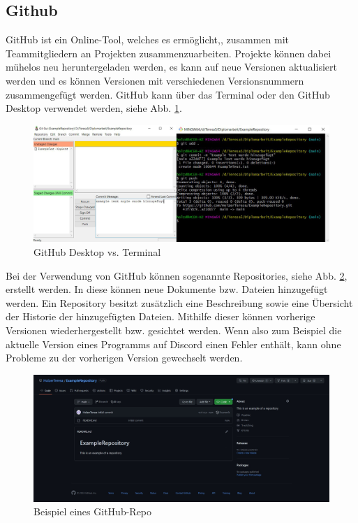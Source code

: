 \subsection{Github} 
GitHub ist ein Online-Tool, welches es ermöglicht,, zusammen mit Teammitgliedern an Projekten zusammenzuarbeiten. Projekte können dabei mühelos neu heruntergeladen werden, es kann auf neue Versionen aktualisiert werden und es können Versionen mit verschiedenen Versionsnummern zusammengefügt werden. GitHub kann über das Terminal oder den GitHub Desktop verwendet werden, siehe Abb. \ref{fig:impl:gitHubTerminalVSGUI}.


\begin{figure}[h t]
\centering
\includegraphics[scale=0.45]{pics/githubTerminalGUI.png}
\caption{GitHub Desktop vs. Terminal}
\label{fig:impl:gitHubTerminalVSGUI}
\end{figure}


Bei der Verwendung von GitHub können sogenannte Repositories, siehe Abb. \ref{fig:impl:githubRepository}, erstellt werden. In diese können neue Dokumente bzw. Dateien hinzugefügt werden. Ein Repository besitzt zusätzlich eine Beschreibung sowie eine Übersicht der Historie der hinzugefügten Dateien. Mithilfe dieser können vorherige Versionen wiederhergestellt bzw. gesichtet werden. Wenn also zum Beispiel die aktuelle Version eines Programms auf Discord einen Fehler enthält, kann ohne Probleme zu der vorherigen Version gewechselt werden.




\begin{figure}[h t]
\centering
\includegraphics[scale=0.38]{pics/exampleRepository.jpg}
\caption{Beispiel eines GitHub-Repo}
\label{fig:impl:githubRepository}
\end{figure}

